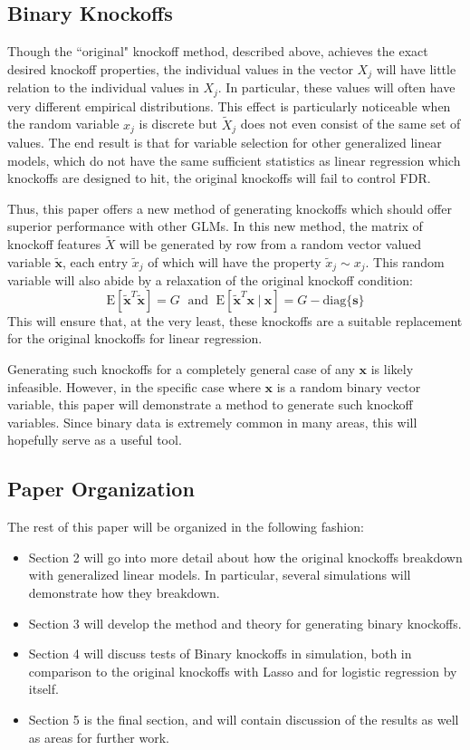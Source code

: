 \documentclass[11pt]{article}
\newcommand{\E}{\mathrm{E}}
\newcommand{\diag}[1]{\mathrm{diag}\{#1\}}
\newcommand{\st}{ \; \big | \:}
\theoremstyle{definition}
\begin{document}
\subsection{Binary Knockoffs}
    Though the ``original" knockoff method, described above, achieves the exact desired knockoff properties, the individual values in the vector $X_j$ will have little relation to the individual values in $X_j$. In particular, these values will often have very different empirical distributions. This effect is particularly noticeable when the random variable $x_j$ is discrete but $\tilde X_j$ does not even consist of the same set of values. The end result is that for variable selection for other generalized linear models, which do not have the same sufficient statistics as linear regression which knockoffs are designed to hit, the original knockoffs will fail to control FDR. \par
    Thus, this paper offers a new method of generating knockoffs which should offer superior performance with other GLMs. In this new method, the matrix of knockoff features $\tilde X$ will be generated by row from a random vector valued variable $\mathbf{\tilde x}$, each entry $\tilde x_j$ of which will have the property $\tilde x_j \sim x_j$. This random variable will also abide by a relaxation of the original knockoff condition:
    \[ \E[\mathbf{\tilde x}^T\mathbf{\tilde x}]=G \; \textrm{ and } \; \E[\mathbf{\tilde x}^T \mathbf x \st \mathbf x] = G - \diag{\mathbf s}\]
    This will ensure that, at the very least, these knockoffs are a suitable replacement for the original knockoffs for linear regression. \par
    Generating such knockoffs for a completely general case of any $\mathbf x$ is likely infeasible. However, in the specific case where $\mathbf x$ is a random binary vector variable, this paper will demonstrate a method to generate such knockoff variables. Since binary data is extremely common in many areas, this will hopefully serve as a useful tool.

\subsection{Paper Organization}
The rest of this paper will be organized in the following fashion:
\begin{itemize}
    \item Section 2 will go into more detail about how the original knockoffs breakdown with generalized linear models. In particular, several simulations will demonstrate how they breakdown.
    \item Section 3 will develop the method and theory for generating binary knockoffs.
    \item Section 4 will discuss tests of Binary knockoffs in simulation, both in comparison to the original knockoffs with Lasso and for logistic regression by itself.
    \item Section 5 is the final section, and will contain discussion of the results as well as areas for further work.
\end{itemize}
\end{document}
